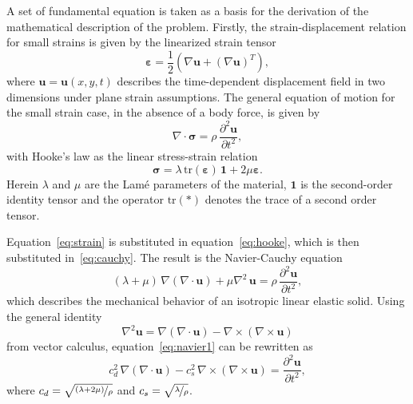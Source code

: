 \documentclass{article}
\renewcommand{\vec}{\boldsymbol}        %
\newcommand{\eps}{\varepsilon}
\begin{document}
A set of fundamental equation is taken as a basis for the derivation of the mathematical description of the problem.
Firstly, the strain-displacement relation for small strains is given by the linearized strain tensor
\begin{equation}
    \vec{\eps} = \frac{1}{2} \left( \nabla \vec{u} + (\nabla \vec{u})^{T} \right),  \label{eq:strain}
\end{equation}
where $\vec{u} = \vec{u}(x,y,t)$ describes the time-dependent displacement field in two dimensions under plane strain assumptions.
The general equation of motion for the small strain case, in the absence of a body force, is given by
\begin{equation}
    \nabla \cdot \vec{\sigma} = \rho \, \frac{\partial^{2} \vec{u}}{\partial t^{2}},    \label{eq:cauchy}
\end{equation}
with Hooke's law as the linear stress-strain relation
\begin{equation}
    \vec{\sigma} = \lambda \, \mathrm{tr}(\vec{\eps}) \, \boldsymbol{1} + 2 \mu \vec{\eps}. \label{eq:hooke}
\end{equation}
Herein $\lambda$ and $\mu$ are the Lam\'{e} parameters of the material, $\boldsymbol{1}$ is the second-order identity tensor and the operator $\mathrm{tr}(*)$ denotes the trace of a second order tensor.

Equation~\eqref{eq:strain} is substituted in equation~\eqref{eq:hooke}, which is then substituted in~\eqref{eq:cauchy}. The result is the Navier-Cauchy equation
\begin{equation}
    (\lambda + \mu) \, \nabla \left( \nabla \cdot \vec{u} \right) + \mu \nabla^2 \, \vec{u} = \rho \, \frac{\partial^{2} \vec{u}}{\partial t^{2}},    \label{eq:navier1}
\end{equation}
which describes the mechanical behavior of an isotropic linear elastic solid.
Using the general identity 
\begin{equation}
    \nabla^2 \vec{u} = \nabla (\nabla \cdot \vec{u}) - \nabla \times (\nabla \times \vec{u})
\end{equation}
from vector calculus, 
equation~\eqref{eq:navier1} can be rewritten as 
\begin{equation}
    c_d^2 \, \nabla (\nabla \cdot \vec{u}) - c_s^2 \, \nabla \times (\nabla \times \vec{u}) = \frac{\partial^{2} \vec{u}}{\partial t^{2}},   \label{eq:wave-navier}
\end{equation}
where $c_d = \sqrt{\nicefrac{(\lambda + 2 \mu)}{\rho}}$ and $c_s = \sqrt{\nicefrac{\lambda}{\rho}}$.
\end{document}
